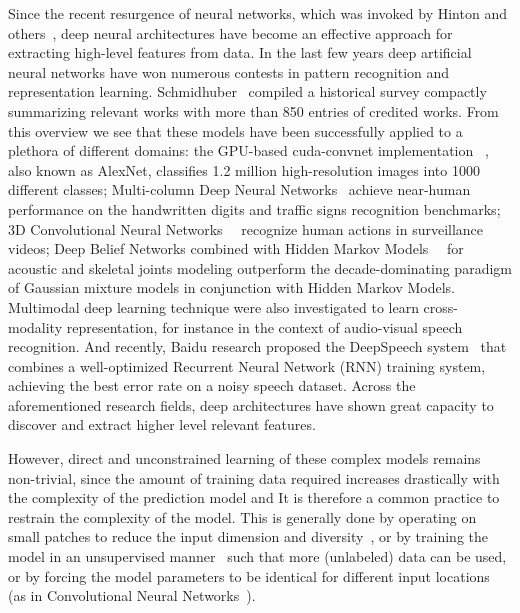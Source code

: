 Since the recent resurgence of neural networks, which was invoked by Hinton and others~\cite{hinton2006fast},
deep neural architectures have become an effective approach for extracting high-level features from data.
In the last few years deep artificial neural networks have won numerous contests in pattern recognition and representation learning.
Schmidhuber~\cite{schmidhuber2014deep} compiled a historical survey compactly summarizing relevant works with more than 850 entries of credited works.
From this overview we see that these models have been successfully applied to a plethora of different domains: the GPU-based cuda-convnet implementation~\cite{krizhevsky2012imagenet} , also known as AlexNet, classifies 1.2 million high-resolution images into 1000 different classes; Multi-column Deep Neural Networks~\cite{ciresan2012multi} achieve near-human performance on the handwritten digits and traffic signs recognition benchmarks; 3D Convolutional Neural Networks~\cite{3dcnn}~\cite{ji20133d} recognize human actions in surveillance videos; Deep Belief Networks combined with Hidden Markov Models~\cite{mohamed2012acoustic}~\cite{diwucvpr14} for acoustic and skeletal joints modeling outperform the decade-dominating paradigm of Gaussian mixture models in conjunction with Hidden Markov Models.
%
Multimodal deep learning technique were also investigated \cite{Ngiam2011multimodal} to learn cross-modality representation,
for instance in the context of audio-visual speech recognition.
%
And recently, Baidu research proposed the DeepSpeech system~\cite{hannun2014deepspeech} that combines a well-optimized Recurrent Neural Network (RNN) training system, achieving the best error rate on a noisy speech dataset. Across the aforementioned research fields, deep architectures have shown great capacity to discover and extract higher level relevant features.

However, direct and unconstrained learning of these complex models remains non-trivial, since the amount of  training data required increases drastically with the complexity of the prediction model and %
It is therefore a common practice to restrain the complexity of the model. This is generally done by operating on small patches to reduce the input dimension and diversity~\cite{baccouche2005spatio}, or by training the model in an unsupervised manner~\cite{le2011learning} such that more (unlabeled) data can be used, or by forcing the model parameters to be identical for different input locations (as in Convolutional Neural Networks~\cite{krizhevsky2012imagenet,ciresan2012multi,3dcnn}).


